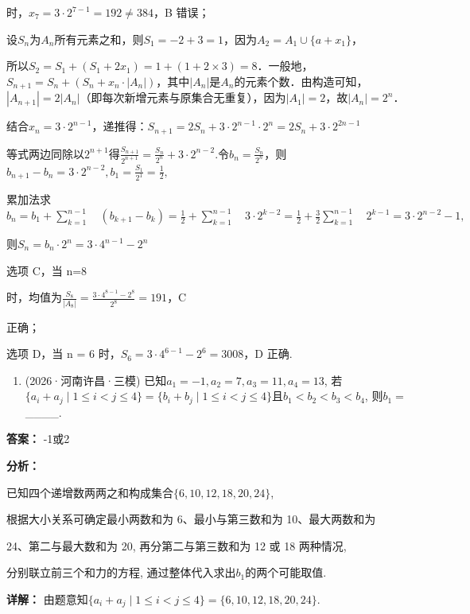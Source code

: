 \documentclass[11pt,a4paper]{ctexart}
\begin{document}
时，\(x_{7} = 3 \cdot 2^{7-1} = 192 \neq 384\)，B 错误；

设\(S_{n}\)为\(A_{n}\)所有元素之和，则\(S_{1}=-2+3=1\)，因为\(A_{2}=A_{1}\cup\{a+x_{1}\}\)，

所以\(S_{2}=S_{1}+(S_{1}+2x_{1})=1+(1+2\times3)=8\)．一般地，\(S_{n+1}=S_{n}+(S_{n}+x_{n}\cdot|A_{n}|)\)，其中\(|A_{n}|\)是\(A_{n}\)的元素个数．由构造可知，\(|A_{n+1}|=2|A_{n}|\)（即每次新增元素与原集合无重复），因为\(|A_{1}|=2\)，故\(|A_{n}|=2^{n}\)．

结合\(x_{n}=3\cdot2^{n-1}\)，递推得：\(S_{n+1}=2S_{n}+3\cdot2^{n-1}\cdot2^{n}=2S_{n}+3\cdot2^{2n-1}\)

等式两边同除以\(2^{n + 1}\)得\(\frac{S_{n + 1}}{2^{n + 1}} = \frac{S_n}{2^n} +3\cdot 2^{n - 2}\).令\(b_{n} = \frac{S_{n}}{2^{n}}\)，则\(b_{n + 1} - b_n = 3\cdot 2^{n - 2},b_1 = \frac{S_1}{2^1} = \frac{1}{2},\)

累加法求\(b_{n}=b_{1}+\sum_{k=1}^{n-1}\quad(b_{k+1}-b_{k})=\frac{1}{2}+\sum_{k=1}^{n-1}\quad3\cdot2^{k-2}=\frac{1}{2}+\frac{3}{2}\sum_{k=1}^{n-1}\quad2^{k-1}=3\cdot2^{n-2}-1,\)

则\(S_{n}=b_{n}\cdot2^{n}=3\cdot4^{n-1}-2^{n}\)

选项 C，当 n=8

时，均值为\(\frac{S_{8}}{|A_{8}|}=\frac{3\cdot4^{8-1}-2^{8}}{2^{8}}=191\)，C

正确；

选项 D，当 n = 6 时，\(S_{6} = 3 \cdot 4^{6-1} - 2^{6} = 3008\)，D 正确.

\begin{enumerate}[label=\arabic*., leftmargin=*, start=6]
\item (2026·河南许昌·三模) 已知\(a_1 = -1, a_2 = 7, a_3 = 11, a_4 = 13\),
  若\(\{a_i + a_j \mid 1 \leq i < j \leq 4\} = \{b_i + b_j \mid 1 \leq i < j \leq 4\}\)且\(b_1 < b_2 < b_3 < b_4\),
  则\(b_1 =\)\_\_\_\_.
\end{enumerate}

\textbf{答案：}
-1或2

\textbf{分析：}

已知四个递增数两两之和构成集合\(\{6,10,12,18,20,24\}\),

根据大小关系可确定最小两数和为 6、最小与第三数和为 10、最大两数和为

24、第二与最大数和为 20, 再分第二与第三数和为 12 或 18 两种情况,

分别联立前三个和力的方程, 通过整体代入求出\(b_{1}\)的两个可能取值.

\textbf{详解：}
由题意知\(\{a_i+a_j\mid1\leq i<j\leq4\}=\{6,10,12,18,20,24\}\).
\end{document}
